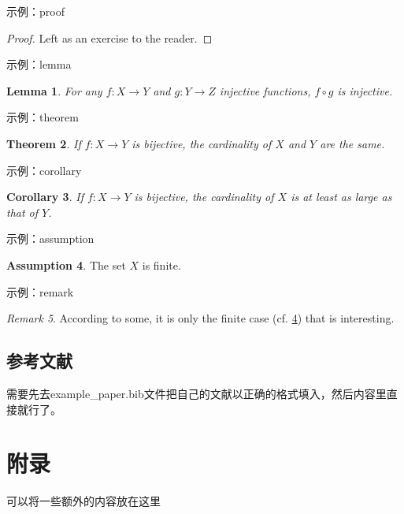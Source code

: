\documentclass{article}
\theoremstyle{plain}
\newtheorem{theorem}{Theorem}[section]
\newtheorem{lemma}[theorem]{Lemma}
\newtheorem{corollary}[theorem]{Corollary}
\theoremstyle{definition}
\newtheorem{assumption}[theorem]{Assumption}
\theoremstyle{remark}
\newtheorem{remark}[theorem]{Remark}
\begin{document}
示例：proof
\begin{proof} 
Left as an exercise to the reader. 
\end{proof}

示例：lemma
\begin{lemma}
\label{lem:usefullemma}
For any $f:X \to Y$ and $g:Y\to Z$ injective functions, $f \circ g$ is injective.
\end{lemma}

示例：theorem
\begin{theorem}
\label{thm:bigtheorem}
If $f:X\to Y$ is bijective, the cardinality of $X$ and $Y$ are the same.
\end{theorem}

示例：corollary
\begin{corollary}
If $f:X\to Y$ is bijective, 
the cardinality of $X$ is at least as large as that of $Y$.
\end{corollary}

示例：assumption
\begin{assumption}
The set $X$ is finite.
\label{ass:xfinite}
\end{assumption}

示例：remark
\begin{remark}
According to some, it is only the finite case (cf. \cref{ass:xfinite}) that is interesting.
\end{remark}


\subsection{参考文献}

需要先去example\_paper.bib文件把自己的文献以正确的格式填入，然后内容里直接\cite{langley00}就行了。






\newpage
\appendix
\onecolumn
\section{附录}

可以将一些额外的内容放在这里
\end{document}
